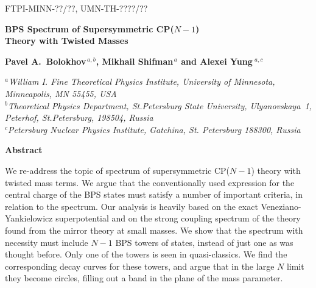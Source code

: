 \documentclass[epsfig,12pt]{article}
\newcommand{\mc}[1]{\mathcal{#1}}
\begin{document}



\begin{titlepage}

\begin{flushright}
FTPI-MINN-??/??, UMN-TH-????/??\\
\end{flushright}

\vspace{0.7cm}

\begin{center}
{  \Large \bf  BPS Spectrum of Supersymmetric CP($N-1$) \\[3mm]
		Theory with \boldmath{$\mc{Z}_N$} Twisted Masses}
\end{center}
\vspace{0.6cm}

\begin{center}

 {\large
 \bf   Pavel A.~Bolokhov$^{\,a,b}$,  Mikhail Shifman$^{\,a}$ and \bf Alexei Yung$^{\,\,a,c}$}
\end {center}

\begin{center}

$^a${\it  William I. Fine Theoretical Physics Institute, University of Minnesota,
Minneapolis, MN 55455, USA}\\
$^b${\it Theoretical Physics Department, St.Petersburg State University, Ulyanovskaya~1, 
	 Peterhof, St.Petersburg, 198504, Russia}\\
$^{c}${\it Petersburg Nuclear Physics Institute, Gatchina, St. Petersburg
188300, Russia
}
\end{center}


\vspace{0.7cm}


\begin{center}
{\large\bf Abstract}
\end{center}

\hspace{0.3cm}
	We re-address the topic of spectrum of supersymmetric CP($N-1$) theory with twisted mass terms.
	We argue that the conventionally used expression for the central charge of the BPS states must satisfy a 
	number of important criteria, in relation to the spectrum.
	Our analysis is heavily based on the exact Veneziano-Yankielowicz superpotential and on
	the strong coupling spectrum of the theory found from the mirror theory at small masses.
	We show that the spectrum with necessity must include $ N - 1 $ BPS towers of states, instead
	of just one as was thought before. 
	Only one of the towers is seen in quasi-classics.
	We find the corresponding decay curves for these towers, and argue that in the large $ N $ limit
	they become circles, filling out a band in the plane of the mass parameter.
\vspace{2cm}


\end{titlepage}
\end{document}
